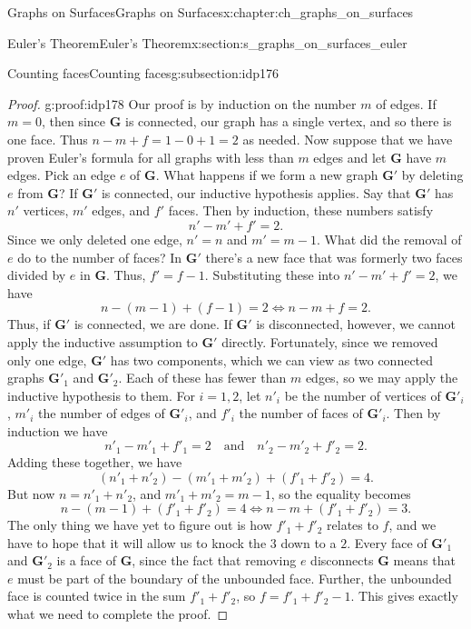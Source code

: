\documentclass[oneside,10pt,]{book}
\numberwithin{equation}{section}
\newcommand{\bfG}{\mathbf{G}}
\begin{document}
\begin{chapterptx}{Graphs on Surfaces}{}{Graphs on Surfaces}{}{}{x:chapter:ch_graphs_on_surfaces}
\begin{sectionptx}{Euler's Theorem}{}{Euler's Theorem}{}{}{x:section:s_graphs_on_surfaces_euler}
\begin{subsectionptx}{Counting faces}{}{Counting faces}{}{}{g:subsection:idp176}
\begin{proof}{}{g:proof:idp178}
Our proof is by induction on the number \(m\) of edges. If \(m=0\), then since \(\bfG\) is connected, our graph has a single vertex, and so there is one face. Thus \(n-m+f = 1-0+1=2\) as needed. Now suppose that we have proven Euler's formula for all graphs with less than \(m\) edges and let \(\bfG\) have \(m\) edges. Pick an edge \(e\) of \(\bfG\). What happens if we form a new graph \(\bfG'\) by deleting \(e\) from \(\bfG\)? If \(\bfG'\) is connected, our inductive hypothesis applies. Say that \(\bfG'\) has \(n'\) vertices, \(m'\) edges, and \(f'\) faces. Then by induction, these numbers satisfy%
\begin{equation*}
n'-m'+f'=2.
\end{equation*}
Since we only deleted one edge, \(n'=n\) and \(m'=m-1\). What did the removal of \(e\) do to the number of faces? In \(\bfG'\) there's a new face that was formerly two faces divided by \(e\) in \(\bfG\). Thus, \(f'=f-1\). Substituting these into \(n'-m'+f'=2\), we have%
\begin{equation*}
n-(m-1)+(f-1)=2 \iff n-m+f=2.
\end{equation*}
Thus, if \(\bfG'\) is connected, we are done. If \(\bfG'\) is disconnected, however, we cannot apply the inductive assumption to \(\bfG'\) directly. Fortunately, since we removed only one edge, \(\bfG'\) has two components, which we can view as two connected graphs \(\bfG'_1\) and \(\bfG'_2\). Each of these has fewer than \(m\) edges, so we may apply the inductive hypothesis to them. For \(i=1,2\), let \(n'_i\) be the number of vertices of \(\bfG'_i\), \(m'_i\) the number of edges of \(\bfG'_i\), and \(f'_i\) the number of faces of \(\bfG'_i\). Then by induction we have%
\begin{equation*}
n'_1 - m'_1 + f'_1 = 2 \quad \text{and} \quad n'_2-m'_2+f'_2 =2.
\end{equation*}
Adding these together, we have%
\begin{equation*}
(n'_1 + n'_2) - (m'_1 + m'_2) + (f'_1 + f'_2) = 4.
\end{equation*}
But now \(n=n'_1 + n'_2\), and \(m'_1 + m'_2 = m-1\), so the equality becomes%
\begin{equation*}
n - (m-1) + (f'_1+f'_2) = 4 \iff n-m + (f'_1 + f'_2) = 3.
\end{equation*}
The only thing we have yet to figure out is how \(f'_1+f'_2\) relates to \(f\), and we have to hope that it will allow us to knock the \(3\) down to a \(2\). Every face of \(\bfG'_1\) and \(\bfG'_2\) is a face of \(\bfG\), since the fact that removing \(e\) disconnects \(\bfG\) means that \(e\) must be part of the boundary of the unbounded face. Further, the unbounded face is counted twice in the sum \(f'_1 + f'_2\), so \(f=f'_1 + f'_2 -1\). This gives exactly what we need to complete the proof.%

\end{proof}
\end{subsectionptx}
\end{sectionptx}
\end{chapterptx}
\end{document}
